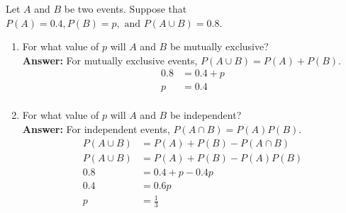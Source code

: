\documentclass{article}
\begin{document}
	Let $A$ and $B$ be two events. Suppose that $P(A) = 0.4, P(B) = p, \text{ and } P(A \cup B) = 0.8$.
	\begin{enumerate}[\ \ (a)\ ]
		\item For what value of $p$ will $A$ and $B$ be mutually exclusive?\\
		\textbf{Answer:}  For mutually exclusive events, $P(A\cup B) = P(A) + P(B)$.
		\begin{align*}
			0.8 &= 0.4 + p\\
			p &= 0.4 \\		
		\end{align*}
		\item For what value of $p$ will $A$ and $B$ be independent?\\
		\textbf{Answer:}  For independent events, $P(A\cap B) = P(A)P(B)$.
		\begin{align*}
			P(A\cup B) &= P(A) + P(B) - P(A\cap B) \\
			P(A\cup B) &= P(A) + P(B) - P(A)P(B)\\
			0.8 &= 0.4 + p - 0.4p\\
			0.4 &= 0.6p\\
			p &= \frac{1}{3}\\
		\end{align*}
	\end{enumerate}
	
\end{document}

